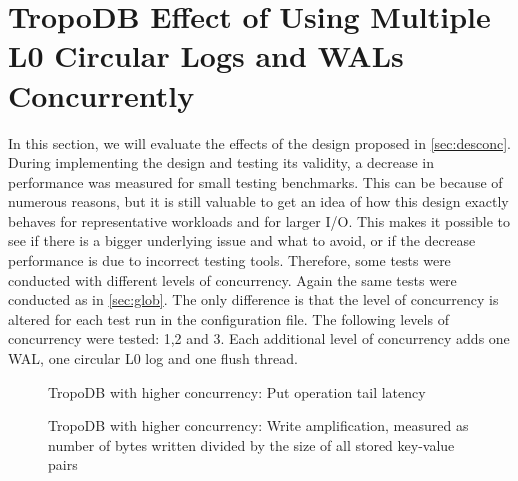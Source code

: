 \section{TropoDB Effect of Using Multiple L0 Circular Logs and WALs Concurrently}
\label{sec:evalconc}
In this section, we will evaluate the effects of the design proposed in \autoref{sec:desconc}. During implementing the design and testing its validity, a decrease in performance was measured for small testing benchmarks. This can be because of numerous reasons, but it is still valuable to get an idea of how this design exactly behaves for representative workloads and for larger I/O.  This makes it possible to see if there is a bigger underlying issue and what to avoid, or if the decrease performance is due to incorrect testing tools. Therefore, some tests were conducted with different levels of concurrency. Again the same tests were conducted as in \autoref{sec:glob}. The only difference is that the level of concurrency is altered for each test run in the configuration file. The following levels of concurrency were tested: 1,2 and 3. Each additional level of concurrency adds one WAL, one circular L0 log and one flush thread.

\begin{figure}[!ht]
    \hspace*{-0.075\textwidth} %
    \raggedleft
    \caption{ TropoDB with higher concurrency: Put operation tail latency }
    \label{fig:concreslat}
\end{figure}

\begin{figure}[!ht]
    \hspace*{-0.075\textwidth} %
    \raggedleft
    \caption{ TropoDB with higher concurrency: Write amplification, measured as number of bytes written divided by the size of all stored key-value pairs  }
    \label{fig:concreswa}
\end{figure}

